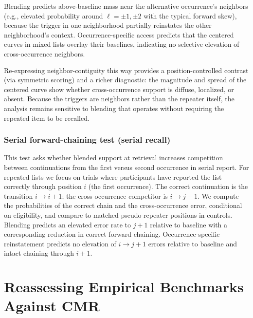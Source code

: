 \documentclass[
  letterpaper,
  11pt,
  english,
  singlespacing,
  headsepline]{MastersDoctoralThesis}
\begin{document}
Blending predicts above-baseline mass near the alternative occurrence's
neighbors (e.g., elevated probability around \(\ell=\pm1,\pm2\) with the
typical forward skew), because the trigger in one neighborhood partially
reinstates the other neighborhood's context. Occurrence-specific access
predicts that the centered curves in mixed lists overlay their
baselines, indicating no selective elevation of cross-occurrence
neighbors.

Re-expressing neighbor-contiguity this way provides a
position-controlled contrast (via symmetric scoring) and a richer
diagnostic: the magnitude and spread of the centered curve show whether
cross-occurrence support is diffuse, localized, or absent. Because the
triggers are neighbors rather than the repeater itself, the analysis
remains sensitive to blending that operates without requiring the
repeated item to be recalled.

\subsubsection{Serial forward-chaining test (serial
recall)}\label{serial-forward-chaining-test-serial-recall}

This test asks whether blended support at retrieval increases
competition between continuations from the first versus second
occurrence in serial report. For repeated lists we focus on trials where
participants have reported the list correctly through position \(i\)
(the first occurrence). The correct continuation is the transition
\(i\rightarrow i{+}1\); the cross-occurrence competitor is
\(i\rightarrow j{+}1\). We compute the probabilities of the correct
chain and the cross-occurrence error, conditional on eligibility, and
compare to matched pseudo-repeater positions in controls. Blending
predicts an elevated error rate to \(j{+}1\) relative to baseline with a
corresponding reduction in correct forward chaining. Occurrence-specific
reinstatement predicts no elevation of \(i\rightarrow j{+}1\) errors
relative to baseline and intact chaining through \(i{+}1\).

\section{Reassessing Empirical Benchmarks Against
CMR}\label{reassessing-empirical-benchmarks-against-cmr}
\end{document}
